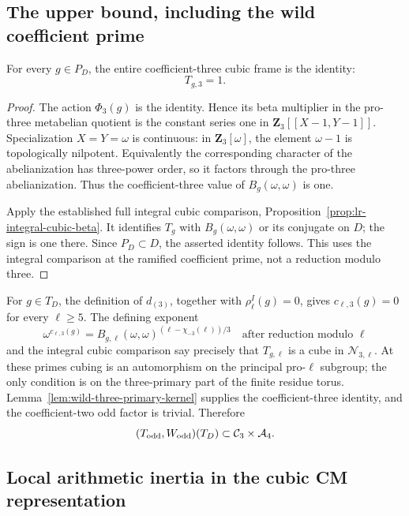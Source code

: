 \subsection{The upper bound, including the wild coefficient prime}

\begin{lemma}\label{lem:wild-three-primary-kernel}
For every \(g\in P_D\), the entire coefficient-three cubic
frame is the identity:
\[
                              T_{g,3}=1.
\]
\end{lemma}

\begin{proof}
The action \(\Phi_3(g)\) is the identity.
Hence its beta multiplier in the pro-three metabelian
quotient is the constant series one in
\(\mathbf Z_3[[X-1,Y-1]]\).
Specialization \(X=Y=\omega\) is continuous: in
\(\mathbf Z_3[\omega]\), the element \(\omega-1\) is
topologically nilpotent. Equivalently the corresponding
character of the abelianization has three-power order,
so it factors through the pro-three abelianization.
Thus the coefficient-three value of \(B_g(\omega,\omega)\)
is one.

Apply the established full integral cubic comparison,
Proposition~\ref{prop:lr-integral-cubic-beta}.
It identifies \(T_g\) with \(B_g(\omega,\omega)\) or its
conjugate on \(D\); the sign is one there.
Since \(P_D\subset D\), the asserted identity follows.
This uses the integral comparison at the ramified coefficient
prime, not a reduction modulo three.
\end{proof}

For \(g\in T_D\), the definition of \(d_{(3)}\), together with
\(\rho_\ell^I(g)=0\), gives \(c_{\ell,3}(g)=0\) for every
\(\ell\ge5\).
The defining exponent
\[
 \omega^{c_{\ell,3}(g)}
 =B_{g,\ell}(\omega,\omega)^{
                  (\ell-\chi_{-3}(\ell))/3}
 \quad\text{after reduction modulo }\ell
\]
and the integral cubic comparison say precisely that
\(T_{g,\ell}\) is a cube in \(\mathcal N_{3,\ell}\).
At these primes cubing is an automorphism on the principal
pro-\(\ell\) subgroup; the only condition is on the
three-primary part of the finite residue torus.
Lemma~\ref{lem:wild-three-primary-kernel} supplies the
coefficient-three identity, and the coefficient-two odd
factor is trivial. Therefore
\begin{equation}\label{eq:exact-joint-odd-6}
(T_{\rm odd},W_{\rm odd})(T_D)
        \subset\mathcal C_3\times\mathcal A_4.
\end{equation}

\subsection{Local arithmetic inertia in the cubic CM representation}

